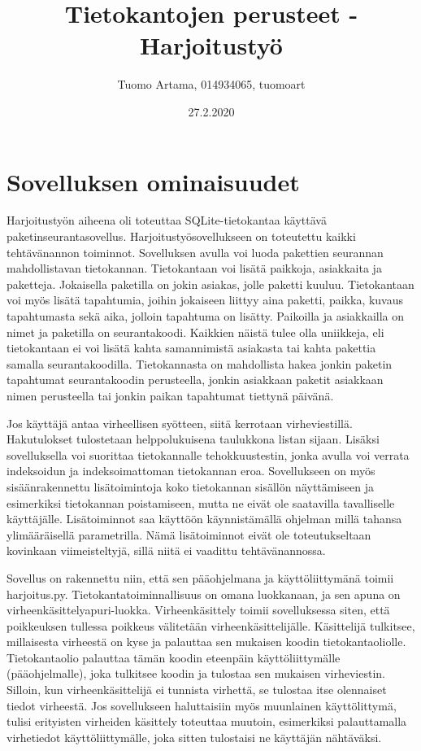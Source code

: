 \documentclass{scrartcl}
\title{Tietokantojen perusteet - Harjoitustyö}
\author{Tuomo Artama, 014934065, tuomoart}
\date{27.2.2020}
\begin{document}
\maketitle
\thispagestyle{empty}
\newpage

\section{Sovelluksen ominaisuudet}

Harjoitustyön aiheena oli toteuttaa SQLite-tietokantaa käyttävä paketinseurantasovellus. Harjoitustyösovellukseen on toteutettu kaikki tehtävänannon toiminnot. Sovelluksen avulla voi luoda pakettien seurannan mahdollistavan tietokannan. Tietokantaan voi lisätä paikkoja, asiakkaita ja paketteja. Jokaisella paketilla on jokin asiakas, jolle paketti kuuluu. Tietokantaan voi myös lisätä tapahtumia, joihin jokaiseen liittyy aina paketti, paikka, kuvaus tapahtumasta sekä aika, jolloin tapahtuma on lisätty. Paikoilla ja asiakkailla on nimet ja paketilla on seurantakoodi. Kaikkien näistä tulee olla uniikkeja, eli tietokantaan ei voi lisätä kahta samannimistä asiakasta tai kahta pakettia samalla seurantakoodilla. Tietokannasta on mahdollista hakea jonkin paketin tapahtumat seurantakoodin perusteella, jonkin asiakkaan paketit asiakkaan nimen perusteella tai jonkin paikan tapahtumat tiettynä päivänä.

Jos käyttäjä antaa virheellisen syötteen, siitä kerrotaan virheviestillä. Hakutulokset tulostetaan helppolukuisena taulukkona listan sijaan. Lisäksi sovelluksella voi suorittaa tietokannalle tehokkuustestin, jonka avulla voi verrata indeksoidun ja indeksoimattoman tietokannan eroa. Sovellukseen on myös sisäänrakennettu lisätoimintoja koko tietokannan sisällön näyttämiseen ja esimerkiksi tietokannan poistamiseen, mutta ne eivät ole saatavilla tavalliselle käyttäjälle. Lisätoiminnot saa käyttöön käynnistämällä ohjelman millä tahansa ylimääräisellä parametrilla. Nämä lisätoiminnot eivät ole toteutukseltaan kovinkaan viimeisteltyjä, sillä niitä ei vaadittu tehtävänannossa.

Sovellus on rakennettu niin, että sen pääohjelmana ja käyttöliittymänä toimii harjoitus.py. Tietokantatoiminnallisuus on omana luokkanaan, ja sen apuna on virheenkäsittelyapuri-luokka. Virheenkäsittely toimii sovelluksessa siten, että poikkeuksen tullessa poikkeus välitetään virheenkäsittelijälle. Käsittelijä tulkitsee, millaisesta virheestä on kyse ja palauttaa sen mukaisen koodin tietokantaoliolle. Tietokantaolio palauttaa tämän koodin eteenpäin käyttöliittymälle (pääohjelmalle), joka tulkitsee koodin ja tulostaa sen mukaisen virheviestin. Silloin, kun virheenkäsittelijä ei tunnista virhettä, se tulostaa itse olennaiset tiedot virheestä. Jos sovellukseen haluttaisiin myös muunlainen käyttölittymä, tulisi erityisten virheiden käsittely toteuttaa muutoin, esimerkiksi palauttamalla virhetiedot käyttöliittymälle, joka sitten tulostaisi ne käyttäjän nähtäväksi.
\end{document}
